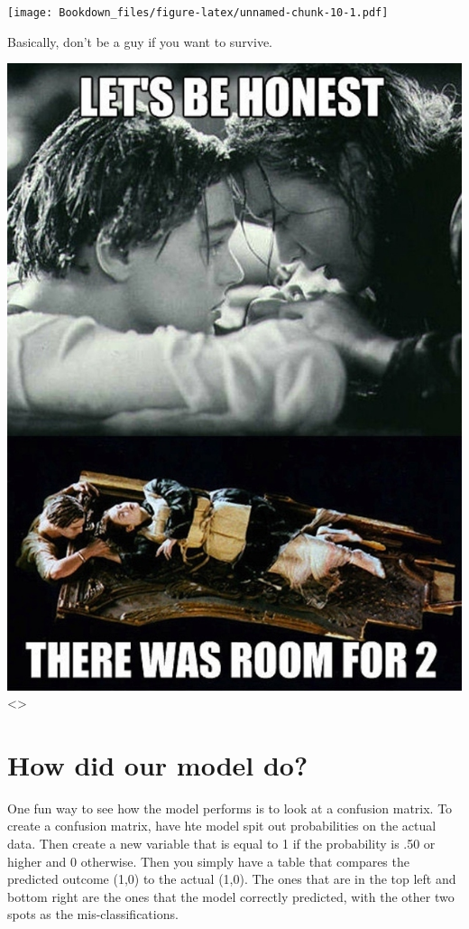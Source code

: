 \documentclass[]{book}
\begin{document}
\texttt{[image: Bookdown\_files/figure-latex/unnamed-chunk-10-1.pdf]}

Basically, don't be a guy if you want to survive.

\includegraphics{titanic_meme.jpg} \textless{}\center\textgreater{}

\section{How did our model do?}\label{how-did-our-model-do}

One fun way to see how the model performs is to look at a confusion
matrix. To create a confusion matrix, have hte model spit out
probabilities on the actual data. Then create a new variable that is
equal to 1 if the probability is .50 or higher and 0 otherwise. Then you
simply have a table that compares the predicted outcome (1,0) to the
actual (1,0). The ones that are in the top left and bottom right are the
ones that the model correctly predicted, with the other two spots as the
mis-classifications.
\end{document}
